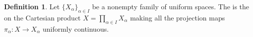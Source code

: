 \documentclass[12pt]{article}
\theoremstyle{definition}
\newtheorem*{definition*}{Definition}
\begin{document}
\begin{definition*}
Let $\{X_{\alpha}\}_{\alpha\in I}$ be a nonempty family of uniform spaces.  The \emph{} is the  on the Cartesian product $X=\prod_{\alpha\in I} X_{\alpha}$ making all the projection maps $\pi_{\alpha}\colon X\to X_{\alpha}$ uniformly continuous.
\end{definition*}

\end{document}
